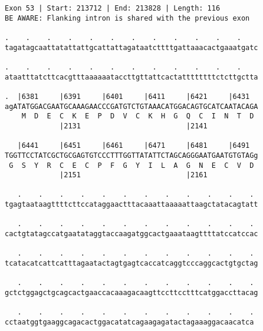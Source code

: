 \documentclass{article}
\begin{document}
\begin{Verbatim}[fontfamily=courier]
Exon 53 | Start: 213712 | End: 213828 | Length: 116
BE AWARE: Flanking intron is shared with the previous exon

.    .    .    .    .    .    .    .    .    .    .    .    
tagatagcaattatattattgcattattagataatcttttgattaaacactgaaatgatc

.    .    .    .    .    .    .    .    .    .    .    .    
ataatttatcttcacgtttaaaaaataccttgttattcactattttttttctcttgctta

.  |6381     |6391     |6401     |6411     |6421     |6431  
agATATGGACGAATGCAAAGAACCCGATGTCTGTAAACATGGACAGTGCATCAATACAGA
    M  D  E  C  K  E  P  D  V  C  K  H  G  Q  C  I  N  T  D 
             |2131                         |2141            

   |6441     |6451     |6461     |6471     |6481     |6491  
TGGTTCCTATCGCTGCGAGTGTCCCTTTGGTTATATTCTAGCAGGGAATGAATGTGTAGg
 G  S  Y  R  C  E  C  P  F  G  Y  I  L  A  G  N  E  C  V  D 
             |2151                         |2161            

   .    .    .    .    .    .    .    .    .    .    .    . 
tgagtaataagttttcttccataggaactttacaaattaaaaattaagctatacagtatt

   .    .    .    .    .    .    .    .    .    .    .    . 
cactgtatagccatgaatataggtaccaagatggcactgaaataagttttatccatccac

   .    .    .    .    .    .    .    .    .    .    .    . 
tcatacatcattcatttagaatactagtgagtcaccatcaggtcccaggcactgtgctag

   .    .    .    .    .    .    .    .    .    .    .    . 
gctctggagctgcagcactgaaccacaaagacaagttccttcctttcatggaccttacag

   .    .    .    .    .    .    .    .    .    .    .    .
cctaatggtgaaggcagacactggacatatcagaagagatactagaaaggacaacatca
\end{Verbatim}
\newpage
\end{document}
